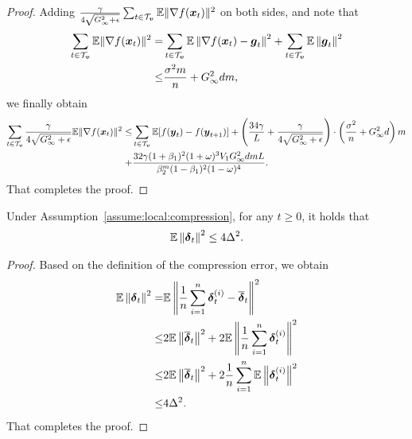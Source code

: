 \begin{proof}
Adding $\frac{\gamma}{4\sqrt{G_\infty^2+\epsilon}}\sum_{t\in\mathcal{T}_{\boldsymbol{v}}}\mathbb{E}\|\nabla f(\boldsymbol{x}_t)\|^2$ on both sides, and note that
\begin{align*}
    \sum_{t\in\mathcal{T}_{\boldsymbol{v}}}\mathbb{E}\|\nabla f(\boldsymbol{x}_t)\|^2 = & \sum_{t\in\mathcal{T}_{\boldsymbol{v}}}\mathbb E\left\|\nabla f(\boldsymbol{x}_t) - \boldsymbol{g}_t\right\|^2 + \sum_{t\in\mathcal{T}_{\boldsymbol{v}}}\mathbb E\left\|\boldsymbol{g}_t\right\|^2 \\
\leq & \frac{\sigma^2m}{n} + G_\infty^2dm,
\end{align*}
we finally obtain
\begin{align*}
    \sum_{t\in\mathcal{T}_{\boldsymbol{v}}}\frac{\gamma}{4\sqrt{G_\infty^2+\epsilon}}\mathbb{E}\|\nabla f(\boldsymbol{x}_t)\|^2 \leq & \sum_{t\in\mathcal{T}_{\boldsymbol{v}}}\mathbb{E}[f(\boldsymbol{y}_{t}) - f(\boldsymbol{y}_{t+1})] + \left( \frac{34\gamma}{L}+\frac{\gamma}{4\sqrt{G_\infty^2+\epsilon}}\right)\cdot\left(\frac{\sigma^2}{n} + G_\infty^2d\right)m \\
+ & \frac{32\gamma(1+\beta_1)^2(1+\omega)^3V_1G_\infty^2dmL}{\beta_2^m(1-\beta_1)^2(1-\omega)^4}.
\end{align*}
That completes the proof.
\end{proof}

\begin{lemma}
\label{lemma:local:delta_bound}
Under Assumption~\ref{assume:local:compression}, for any $t\geq 0$, it holds that
\begin{align*}
    \mathbb{E}\left\| \boldsymbol{\delta}_{t} \right\|^2 \leq 4\Delta^2.
\end{align*}
\end{lemma}
\begin{proof}
Based on the definition of the compression error, we obtain
\begin{align*}
\mathbb{E}\left\| \boldsymbol{\delta}_{t} \right\|^2 = & \mathbb{E}\left\| \frac{1}{n}\sum_{i=1}^{n}\boldsymbol{\delta}^{(i)}_{t} - \overline{\boldsymbol{\delta}}_{t} \right\|^2 \\
    \leq & 2\mathbb{E}\left\| \overline{\boldsymbol{\delta}}_{t} \right\|^2 + 2\mathbb{E}\left\| \frac{1}{n}\sum_{i=1}^{n}\boldsymbol{\delta}^{(i)}_{t} \right\|^2 \\
\leq & 2\mathbb{E}\left\| \overline{\boldsymbol{\delta}}_{t} \right\|^2 + 2\frac{1}{n}\sum_{i=1}^{n}\mathbb{E}\left\| \boldsymbol{\delta}^{(i)}_{t} \right\|^2 \\
    \leq & 4\Delta^2.
\end{align*}
That completes the proof.
\end{proof}

